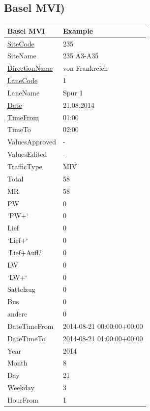 \documentclass{article}
\begin{document}
\newpage

\subsection{Basel MVI)}


\begin{tabular}{ |p{8cm}| p{6cm}|  }
\hline
 Basel MVI & Example\\
 \hline
 \uline{SiteCode}& 235\\
    SiteName&  235 A3-A35 \\
    \uline{DirectionName}& von Frankreich \\
    \uline{LaneCode}& 1\\
    LaneName& Spur 1\\
    \uline{Date}& 21.08.2014\\
    \uline{TimeFrom}& 01:00\\
    TimeTo& 02:00\\
    ValuesApproved& - \\
    ValuesEdited& -\\
    TrafficType& MIV \\
    Total& 58\\
    MR& 58\\
    PW& 0\\
    `PW+`& 0\\
    Lief& 0\\
    `Lief+`& 0\\
    `Lief+Aufl.`& 0\\
    LW &0 \\
    `LW+`& 0 \\
    Sattelzug & 0\\
    Bus& 0 \\
    andere & 0\\
    DateTimeFrom & 2014-08-21 00:00:00+00:00\\
    DateTimeTo   & 2014-08-21 01:00:00+00:00\\
    Year     & 2014\\
    Month     & 8\\
    Day         & 21\\
    Weekday       & 3\\
    HourFrom     & 1\\
 \hline
\end{tabular}\\


\newpage
\end{document}
